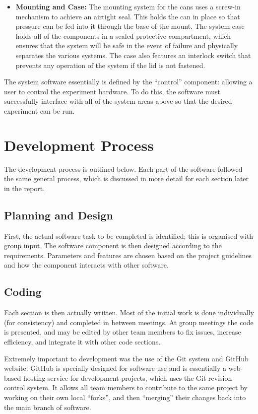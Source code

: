 \begin{itemize}
	\item {\bf Mounting and Case:} The mounting system for the cans uses a screw-in mechanism to achieve an airtight seal. This holds the can in place so that pressure can be fed into it through the base of the mount. The system case holds all of the components in a sealed protective compartment, which ensures that the system will be safe in the event of failure and physically separates the various systems. The case also features an interlock switch that prevents any operation of the system if the lid is not fastened.

\end{itemize}

The system software essentially is defined by the ``control'' component: allowing a user to control the experiment hardware. To do this, the software must successfully interface with all of the system areas above so that the desired experiment can be run. 

\section{Development Process}

The development process is outlined below. Each part of the software followed the same general process, which is discussed in more detail for each section later in the report.

\subsection{Planning and Design}
First, the actual software task to be completed is identified; this is organised with group input. The software component is then designed according to the requirements. Parameters and features are chosen based on the project guidelines and how the component interacts with other software. 

\subsection{Coding}

Each section is then actually written. Most of the initial work is done individually (for consistency) and completed in between meetings. At group meetings the code is presented, and may be edited by other team members to fix issues, increase efficiency, and integrate it with other code sections.


Extremely important to development was the use of the Git system\cite{github,gitucc} and GitHub website\cite{github}. GitHub is specially designed for software use and is essentially a web-based hosting service for development projects, which uses the Git revision control system. It allows all team members to contribute to the same project by working on their own local ``forks'', and then ``merging'' their changes back into the main branch of software\cite{github_fork}.

